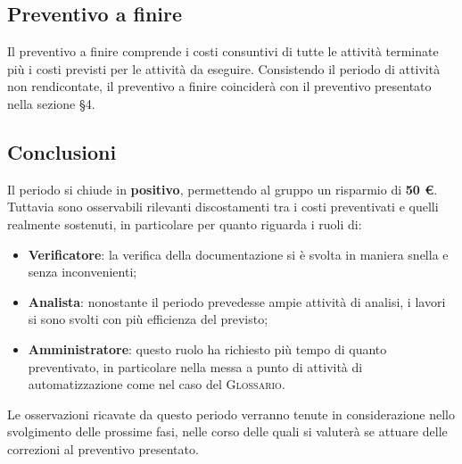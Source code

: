 \subsection{Preventivo a finire}
Il preventivo a finire comprende i costi consuntivi di tutte le attività terminate più i costi previsti per le attività da eseguire. Consistendo il periodo di attività non rendicontate, il preventivo a finire coinciderà con il preventivo presentato nella sezione \S 4.



\subsection{Conclusioni}

Il periodo si chiude in \textbf{positivo}, permettendo al gruppo un risparmio di \textbf{50 \euro{}}. Tuttavia sono osservabili rilevanti discostamenti tra i costi preventivati e quelli realmente sostenuti, in particolare per quanto riguarda i ruoli di:
\begin{itemize}
	\item \textbf{Verificatore}: la verifica della documentazione si è svolta in maniera snella e senza inconvenienti;
	\item \textbf{Analista}: nonostante il periodo prevedesse ampie attività di analisi, i lavori si sono svolti con più efficienza del previsto;
	\item \textbf{Amministratore}: questo ruolo ha richiesto più tempo di quanto preventivato, in particolare nella messa a punto di attività di automatizzazione come nel caso del \textsc{Glossario}.
\end{itemize}
Le osservazioni ricavate da questo periodo verranno tenute in considerazione nello svolgimento delle prossime fasi, nelle corso delle quali si valuterà se attuare delle correzioni al preventivo presentato.
